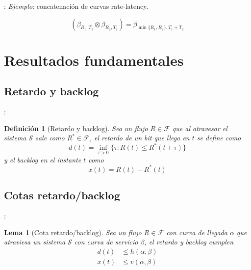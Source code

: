 \documentclass[xcolor={x11names}]{beamer}
\newtheorem{definicion}{Definición}[section]
\newtheorem{lema}{Lema}[section]
\begin{document}
\begin{frame}{\secname: \subsecname}
    \emph{Ejemplo}: concatenación
    de curvas rate-latency.

    \begin{equation*}
        (\beta_{R_1,T_1}\otimes
        \beta_{R_2,T_2})
        =\beta_{\min\{R_1,R_2\},T_1+T_2}
    \end{equation*}


    \begin{figure}[h]
        \centering
        
    \end{figure}
\end{frame}




\section{Resultados fundamentales}
\subsection{Retardo y backlog}
\begin{frame}{\secname: \subsecname}
    \begin{definicion}[Retardo y backlog]
        Sea un flujo $R\in\mathcal{F}$
        que al atravesar
        el sistema $\mathcal{S}$
        sale como $R^*\in\mathcal{F}$,
        el retardo de un bit que
        llega en $t$ se define como
        \begin{equation*}
            d(t)=\inf_{\tau>0}
            \{\tau: R(t)\leq R^*(t+\tau)\}
        \end{equation*}
        y el backlog en el instante $t$
        como
        \begin{equation*}
            x(t)=R(t)-R^*(t)
        \end{equation*}
    \end{definicion}

    \begin{figure}[h]
        \centering
        
    \end{figure}

\end{frame}



\subsection{Cotas retardo/backlog}
\begin{frame}{\secname: \subsecname}
    \begin{lema}[Cota retardo/backlog]
        Sea un flujo $R\in\mathcal{F}$
        con curva de llegada
        $\alpha$ que atraviesa un
        sistema $\mathcal{S}$ con
        curva de servicio $\beta$,
        el retardo y backlog cumplen
        \begin{align*}
            d(t)&\leq h(\alpha,\beta)\\
            x(t)&\leq v(\alpha,\beta)
        \end{align*}
    \end{lema}
\end{frame}
\end{document}
